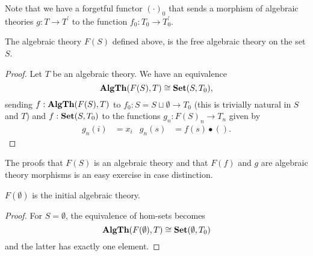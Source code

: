 Note that we have a forgetful functor $ (\cdot)_0 $ that sends a morphism of algebraic theories $ g: T \to T^\prime $ to the function $ f_0: T_0 \to T^\prime_0 $.

\begin{lemma}
  The algebraic theory $ F(S) $ defined above, is the free algebraic theory on the set $ S $.
\end{lemma}
\begin{proof}
  Let $ T $ be an algebraic theory. We have an equivalence
  \[ \mathbf{AlgTh}(F(S), T) \cong \mathbf{Set}(S, T_0), \]
  sending $ f: \mathbf{AlgTh}(F(S), T) $ to $ f_0: S = S \sqcup \emptyset \to T_0 $ (this is trivially natural in $ S $ and $ T $) and $ f: \mathbf{Set}(S, T_0) $ to the functions $ g_n: F(S)_n \to T_n $ given by
  \begin{align*}
    g_n(i) &= x_i & g_n(s) &= f(s) \bullet ().
  \end{align*}
\end{proof}

The proofs that $ F(S) $ is an algebraic theory and that $ F(f) $ and $ g $ are algebraic theory morphisms is an easy exercise in case distinction.

\begin{corollary}
  $ F(\emptyset) $ is the initial algebraic theory.
\end{corollary}
\begin{proof}
  For $ S = \emptyset $, the equivalence of hom-sets becomes
  \[ \mathbf{AlgTh}(F(\emptyset), T) \cong \mathbf{Set}(\emptyset, T_0) \]
  and the latter has exactly one element.
\end{proof}

